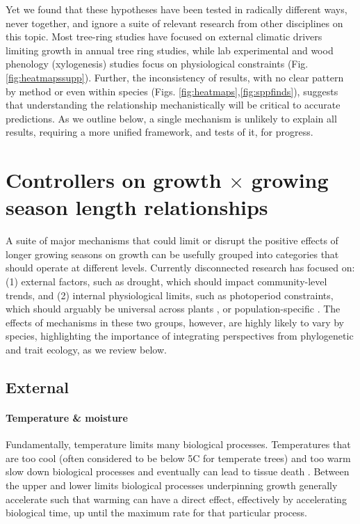 \documentclass[11pt]{article}
\begin{document}
Yet we found that these hypotheses have been tested in radically different ways, never together, and ignore a suite of relevant research from other disciplines on this topic. Most tree-ring studies have focused on external climatic drivers limiting growth in annual tree ring studies, while lab experimental and wood phenology (xylogenesis) studies focus on physiological constraints (Fig. \ref{fig:heatmapssupp}). Further, the inconsistency of results, with no clear pattern by method or even within species (Figs. \ref{fig:heatmaps},\ref{fig:sppfinds}), suggests that understanding the relationship mechanistically will be critical to accurate predictions. As we outline below, a single mechanism is unlikely to explain all results, requiring a more unified framework, and tests of it, for progress. 
 
\section*{Controllers on growth $\times$ growing season length relationships}

A suite of major mechanisms that could limit or disrupt the positive effects of longer growing seasons on growth can be usefully grouped into categories that should operate at different levels. Currently disconnected research has focused on: (1) external factors, such as drought, which should impact community-level trends, and (2) internal physiological limits, such as photoperiod constraints, which should arguably be universal across plants \citep[e.g.,][]{zohner2023effect}, or population-specific \citep[e.g.,][]{soolanayakanahally2013timing}. The effects of mechanisms in these two groups, however, are highly likely to vary by species, highlighting the importance of integrating perspectives from phylogenetic and trait ecology, as we review below. 

\subsection*{External}

\paragraph{Temperature \& moisture} %

Fundamentally, temperature limits many biological processes. Temperatures that are too cool (often considered to be below 5\degree C for temperate trees) and too warm \citep[an area of active research,][see also Fig. \ref{fig:temperaturecomplex}]{martinez2008hot,cabon2022cross} slow down biological processes and eventually can lead to tissue death \citep{larcher1980,kramer2012book}. Between the upper and lower limits biological processes underpinning growth generally accelerate such that warming can have a direct effect, effectively by accelerating biological time, up until the maximum rate for that particular process.
\end{document}
